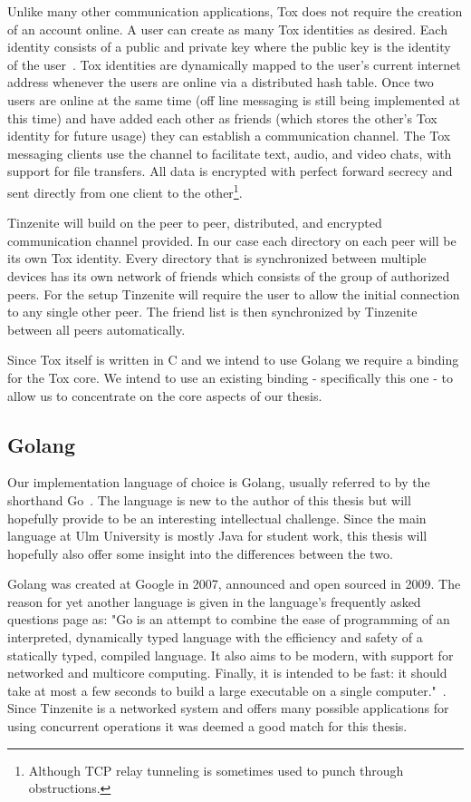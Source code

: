 Unlike many other communication applications, Tox does not require the creation of an account online.
A user can create as many Tox identities as desired.
Each identity consists of a public and private key where the public key is the identity of the user~\cite{web:site:tox:crypto}.
Tox identities are dynamically mapped to the user's current internet address whenever the users are online via a distributed hash table.
Once two users are online at the same time (off line messaging is still being implemented at this time) and have added each other as friends (which stores the other's Tox identity for future usage) they can establish a communication channel.
The Tox messaging clients use the channel to facilitate text, audio, and video chats, with support for file transfers.
All data is encrypted with perfect forward secrecy and sent directly from one client to the other\footnote{Although TCP relay tunneling is sometimes used to punch through obstructions.}.

Tinzenite will build on the peer to peer, distributed, and encrypted communication channel provided.
In our case each directory on each peer will be its own Tox identity.
Every directory that is synchronized between multiple devices has its own network of friends which consists of the group of authorized peers.
For the setup Tinzenite will require the user to allow the initial connection to any single other peer.
The friend list is then synchronized by Tinzenite between all peers automatically.

Since Tox itself is written in C and we intend to use Golang we require a binding for the Tox core.
We intend to use an existing binding - specifically this one \cite{web:site:tox:golang} - to allow us to concentrate on the core aspects of our thesis.

\subsection{Golang}

Our implementation language of choice is Golang, usually referred to by the shorthand Go~\cite{web:site:golang}.
The language is new to the author of this thesis but will hopefully provide to be an interesting intellectual challenge.
Since the main language at Ulm University is mostly Java for student work, this thesis will hopefully also offer some insight into the differences between the two.

Golang was created at Google in 2007, announced and open sourced in 2009.
The reason for yet another language is given in the language's frequently asked questions page as: "Go is an attempt to combine the ease of programming of an interpreted, dynamically typed language with the efficiency and safety of a statically typed, compiled language. It also aims to be modern, with support for networked and multicore computing. Finally, it is intended to be fast: it should take at most a few seconds to build a large executable on a single computer."~\cite{web:site:golang:faq}.
Since Tinzenite is a networked system and offers many possible applications for using concurrent operations it was deemed a good match for this thesis.

